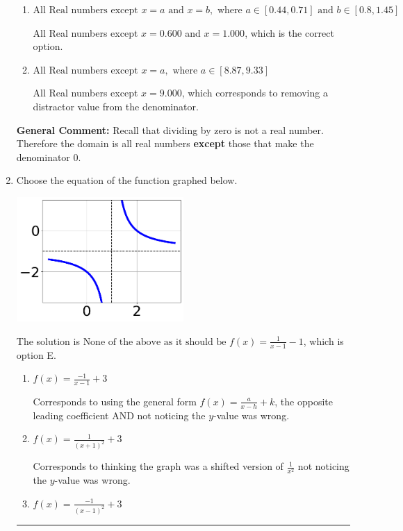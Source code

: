 \documentclass{extbook}[14pt]
\newcommand{\litem}[1]{\item #1

\rule{\textwidth}{0.4pt}}
\begin{document}
\begin{enumerate}
{\begin{enumerate}[label=\Alph*.]
All Real numbers except $x = 9.000$ and $x = 15.000$, which corresponds to not factoring the denominator correctly.
\item \( \text{All Real numbers except } x = a \text{ and } x = b, \text{ where } a \in [0.44, 0.71] \text{ and } b \in [0.8, 1.45] \)

All Real numbers except $x = 0.600$ and $x = 1.000$, which is the correct option.
\item \( \text{All Real numbers except } x = a, \text{ where } a \in [8.87, 9.33] \)

All Real numbers except $x = 9.000$, which corresponds to removing a distractor value from the denominator.
\end{enumerate}

\textbf{General Comment:} Recall that dividing by zero is not a real number. Therefore the domain is all real numbers \textbf{except} those that make the denominator 0.
}
\litem{
Choose the equation of the function graphed below.

\begin{center}
    \includegraphics[width=0.5\textwidth]{../Figures/rationalGraphToEquationCopyA.png}
\end{center}




The solution is \( \text{None of the above as it should be } f(x) = \frac{1}{x - 1} - 1 \), which is option E.\begin{enumerate}[label=\Alph*.]
\item \( f(x) = \frac{-1}{x - 1} + 3 \)

Corresponds to using the general form $f(x) = \frac{a}{x-h}+k$, the opposite leading coefficient AND not noticing the $y$-value was wrong.
\item \( f(x) = \frac{1}{(x + 1)^2} + 3 \)

Corresponds to thinking the graph was a shifted version of $\frac{1}{x^2}$ not noticing the $y$-value was wrong.
\item \( f(x) = \frac{-1}{(x - 1)^2} + 3 \)


\end{enumerate}}
\end{enumerate}
\end{document}
